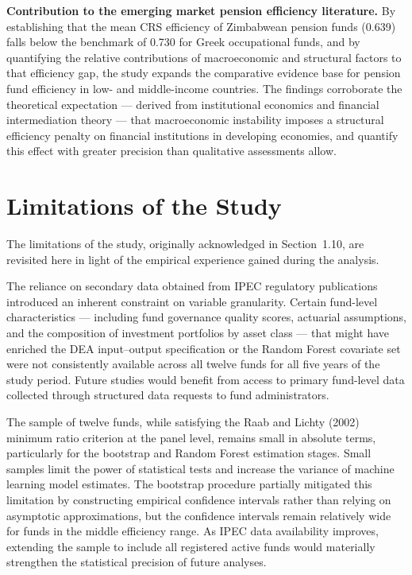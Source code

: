\documentclass[12pt,a4paper]{article}
\begin{document}
\textbf{Contribution to the emerging market pension efficiency literature.} By establishing that the mean CRS efficiency of Zimbabwean pension funds (0.639) falls below the benchmark of 0.730 for Greek occupational funds, and by quantifying the relative contributions of macroeconomic and structural factors to that efficiency gap, the study expands the comparative evidence base for pension fund efficiency in low- and middle-income countries. The findings corroborate the theoretical expectation --- derived from institutional economics and financial intermediation theory --- that macroeconomic instability imposes a structural efficiency penalty on financial institutions in developing economies, and quantify this effect with greater precision than qualitative assessments allow.

\section{Limitations of the Study}

The limitations of the study, originally acknowledged in Section~1.10, are revisited here in light of the empirical experience gained during the analysis.

The reliance on secondary data obtained from IPEC regulatory publications introduced an inherent constraint on variable granularity. Certain fund-level characteristics --- including fund governance quality scores, actuarial assumptions, and the composition of investment portfolios by asset class --- that might have enriched the DEA input--output specification or the Random Forest covariate set were not consistently available across all twelve funds for all five years of the study period. Future studies would benefit from access to primary fund-level data collected through structured data requests to fund administrators.

The sample of twelve funds, while satisfying the Raab and Lichty (2002) minimum ratio criterion at the panel level, remains small in absolute terms, particularly for the bootstrap and Random Forest estimation stages. Small samples limit the power of statistical tests and increase the variance of machine learning model estimates. The bootstrap procedure partially mitigated this limitation by constructing empirical confidence intervals rather than relying on asymptotic approximations, but the confidence intervals remain relatively wide for funds in the middle efficiency range. As IPEC data availability improves, extending the sample to include all registered active funds would materially strengthen the statistical precision of future analyses.
\end{document}
